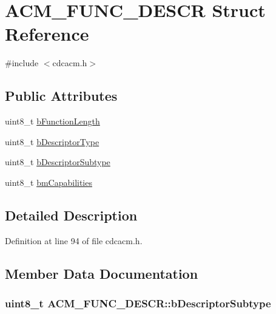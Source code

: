 \hypertarget{struct_a_c_m___f_u_n_c___d_e_s_c_r}{\section{\-A\-C\-M\-\_\-\-F\-U\-N\-C\-\_\-\-D\-E\-S\-C\-R \-Struct \-Reference}
\label{struct_a_c_m___f_u_n_c___d_e_s_c_r}
}


{\ttfamily \#include $<$cdcacm.\-h$>$}

\subsection*{\-Public \-Attributes}
\begin{DoxyCompactItemize}
\item 
uint8\-\_\-t \hyperlink{struct_a_c_m___f_u_n_c___d_e_s_c_r_a46c41dcbc0f3fdc37c0cd411b6b3213e}{b\-Function\-Length}
\item 
uint8\-\_\-t \hyperlink{struct_a_c_m___f_u_n_c___d_e_s_c_r_a4562e71852b142b483b68deaaa360e6a}{b\-Descriptor\-Type}
\item 
uint8\-\_\-t \hyperlink{struct_a_c_m___f_u_n_c___d_e_s_c_r_a139534f16b74c2a09879fbc44fc84199}{b\-Descriptor\-Subtype}
\item 
uint8\-\_\-t \hyperlink{struct_a_c_m___f_u_n_c___d_e_s_c_r_a6c54b317cabd68eebd318257ab02abe4}{bm\-Capabilities}
\end{DoxyCompactItemize}


\subsection{\-Detailed \-Description}


\-Definition at line 94 of file cdcacm.\-h.



\subsection{\-Member \-Data \-Documentation}
\hypertarget{struct_a_c_m___f_u_n_c___d_e_s_c_r_a139534f16b74c2a09879fbc44fc84199}{
\subsubsection[{b\-Descriptor\-Subtype}]{\setlength{\rightskip}{0pt plus 5cm}uint8\-\_\-t {\bf \-A\-C\-M\-\_\-\-F\-U\-N\-C\-\_\-\-D\-E\-S\-C\-R\-::b\-Descriptor\-Subtype}}}\label{struct_a_c_m___f_u_n_c___d_e_s_c_r_a139534f16b74c2a09879fbc44fc84199}


